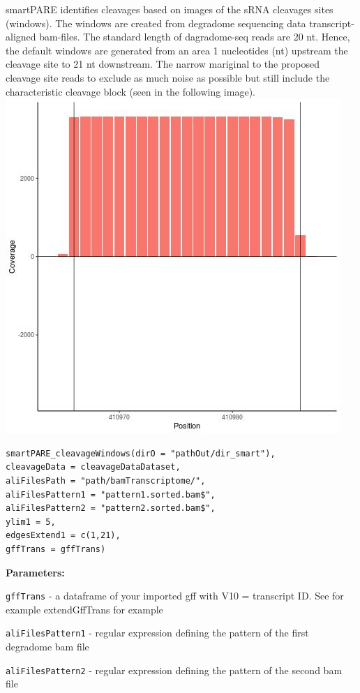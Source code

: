 \documentclass[
]{article}
\begin{document}
smartPARE identifies cleavages based on images of the sRNA cleavages
sites (windows). The windows are created from degradome sequencing data
transcript-aligned bam-files. The standard length of dagradome-seq reads
are 20 nt. Hence, the default windows are generated from an area 1
nucleotides (nt) upstream the cleavage site to 21 nt downstream. The
narrow mariginal to the proposed cleavage site reads to exclude as much
noise as possible but still include the characteristic cleavage block
(seen in the following image).\\
\includegraphics{images/cleavage.jpg}

\begin{verbatim}
smartPARE_cleavageWindows(dirO = "pathOut/dir_smart"),
cleavageData = cleavageDataDataset,
aliFilesPath = "path/bamTranscriptome/",
aliFilesPattern1 = "pattern1.sorted.bam$",
aliFilesPattern2 = "pattern2.sorted.bam$",
ylim1 = 5,
edgesExtend1 = c(1,21),
gffTrans = gffTrans)
\end{verbatim}

\textbf{Parameters:}

\texttt{gffTrans} - a dataframe of your imported gff with V10 =
transcript ID. See for example extendGffTrans for example

\texttt{aliFilesPattern1} - regular expression defining the pattern of
the first degradome bam file

\texttt{aliFilesPattern2} - regular expression defining the pattern of
the second bam file
\end{document}

